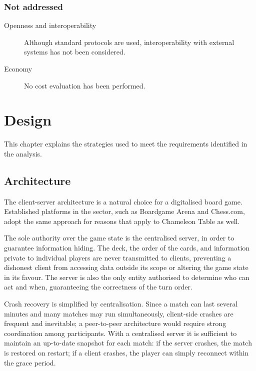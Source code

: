 \documentclass{scrartcl}
\begin{document}
\subsubsection*{Not addressed}

\begin{description}
  \item[Openness and interoperability] Although standard protocols are used,
  interoperability with external systems has not been considered.

  \item[Economy] No cost evaluation has been performed.
\end{description}

\section{Design}\label{design}

This chapter explains the strategies used to meet the requirements identified in the analysis.

\subsection{Architecture}\label{architecture}

The client-server architecture is a natural choice for a digitalised board game.
Established platforms in the sector, such as Boardgame Arena and Chess.com,
adopt the same approach for reasons that apply to Chameleon Table as well.

The sole authority over the game state is the centralised server, in order to
guarantee information hiding.
The deck, the order of the cards, and information private to individual players
are never transmitted to clients, preventing a dishonest client from accessing
data outside its scope or altering the game state in its favour.
The server is also the only entity authorised to determine who can act and when,
guaranteeing the correctness of the turn order.

Crash recovery is simplified by centralisation.
Since a match can last several minutes and many matches may run simultaneously,
client-side crashes are frequent and inevitable; a peer-to-peer architecture
would require strong coordination among participants.
With a centralised server it is sufficient to maintain an up-to-date snapshot
for each match: if the server crashes, the match is restored on restart;
if a client crashes, the player can simply reconnect within the grace period.
\end{document}
